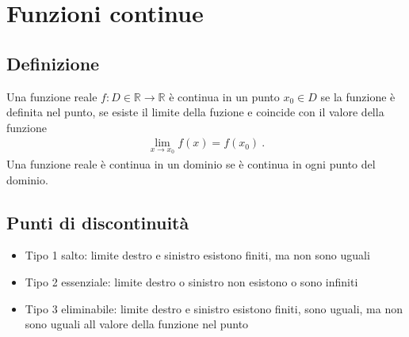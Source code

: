 \documentclass[letterpaper,10pt,italian]{jupyterBook}
\begin{document}
\section{Funzioni continue}
\label{\detokenize{ch/infinitesimal_calculus/analysis:funzioni-continue}}\label{\detokenize{ch/infinitesimal_calculus/analysis:infinitesimal-calculus-continuous-fun}}

\subsection{Definizione}
\label{\detokenize{ch/infinitesimal_calculus/analysis:definizione}}\label{\detokenize{ch/infinitesimal_calculus/analysis:infinitesimal-calculus-continuous-fun-def}}
\sphinxAtStartPar
Una funzione reale \(f: D \in \mathbb{R} \rightarrow \mathbb{R}\) è continua in un punto \(x_0 \in D\) se la funzione è definita nel punto, se esiste il limite della fuzione e coincide con il valore della funzione
\begin{equation*}
\begin{split}\lim_{x \rightarrow x_0} f(x) = f(x_0) \ .\end{split}
\end{equation*}
\sphinxAtStartPar
Una funzione reale è continua in un dominio  se è continua in ogni punto del dominio.


\subsection{Punti di discontinuità}
\label{\detokenize{ch/infinitesimal_calculus/analysis:punti-di-discontinuita}}\label{\detokenize{ch/infinitesimal_calculus/analysis:infinitesimal-calculus-continuous-fun-disc}}\begin{itemize}
\item {} 
\sphinxAtStartPar
Tipo 1 \sphinxhyphen{} salto: limite destro e sinistro esistono finiti, ma non sono uguali

\item {} 
\sphinxAtStartPar
Tipo 2 \sphinxhyphen{} essenziale: limite destro o sinistro non esistono o sono infiniti

\item {} 
\sphinxAtStartPar
Tipo 3 \sphinxhyphen{} eliminabile: limite destro e sinistro esistono finiti, sono uguali, ma non sono uguali all valore della funzione nel punto

\end{itemize}

\sphinxAtStartPar
{} 
\end{document}

